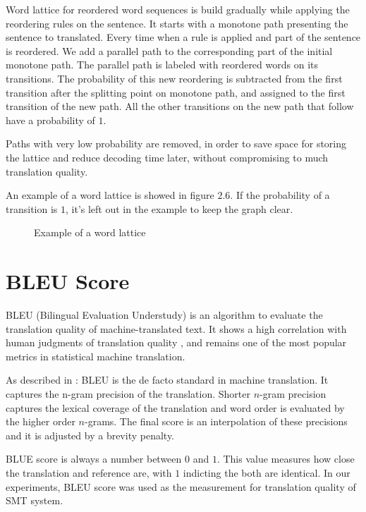 Word lattice for reordered word sequences is build gradually while applying the reordering rules on the sentence. It starts with a monotone path presenting the sentence to translated. Every time when a rule is applied and part of the sentence is reordered. We add a parallel path to the corresponding part of the initial monotone path. The parallel path is labeled with reordered words on its transitions. The probability of this new reordering is subtracted from the first transition after the splitting point on monotone path, and assigned to the first transition of the new path. All the other transitions on the new path that follow have a probability of $1$.


Paths with very low probability are removed, in order to save space for storing the lattice and reduce decoding time later, without compromising to much translation quality. %

An example of a word lattice is showed in figure $2.6$. If the probability of a transition is $1$, it's left out in the example to keep the graph clear.


\begin{landscape}
\begin{figure}
\centering

\caption{Example of a word lattice}
\end{figure}
\end{landscape}

\section{BLEU Score}
\label{ch:Foundations:sec:bleu}

BLEU (Bilingual Evaluation Understudy) is an algorithm to evaluate the translation quality of machine-translated text. It shows a high correlation with human judgments of translation quality \citep{bleuscore}, and remains one of the most popular metrics in statistical machine translation.

As described in \cite{metrics}: BLEU is the de facto standard in machine translation. It captures the n-gram precision of the translation. Shorter $n$-gram precision captures the lexical coverage of the translation and word order is evaluated by the higher order $n$-grams. The final score is an interpolation of these precisions and it is adjusted by a brevity penalty.

BLUE score is always a number between $0$ and $1$. This value measures how close the translation and reference are, with $1$ indicting the both are identical. In our experiments, BLEU score was used as the measurement for translation quality of SMT system.
